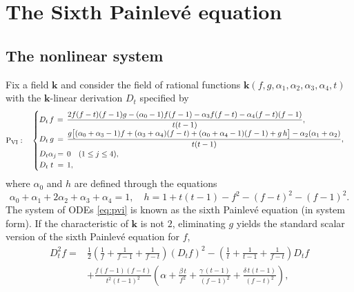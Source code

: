 \documentclass[a4paper,reqno]{amsart}
\numberwithin{equation}{section}
\numberwithin{figure}{section}
\theoremstyle{remark}
\newcommand\Psix{\textrm{P}_{\textrm{VI}}}
\begin{document}
\section{The Sixth Painlev\'e equation}\label{sect:p6}

\subsection{The nonlinear system}
Fix a field $\mathbf{k}$ and consider the field of rational functions $\mathbf{k}(f,g,\alpha_1,\alpha_2,\alpha_3,\alpha_4,t)$ with
the $\mathbf{k}$-linear derivation $D_t$ specified by
 \begin{equation}\label{eq:pvi}
 \Psix:\quad           \begin{cases}
     D_t \hspace{0.5mm}f\hspace{0.5mm}=\,\displaystyle\frac{2f(f-t)(f-1)g-(\alpha_0-1)f(f-1)-\alpha_3 f(f-t)-\alpha_4(f-t)(f-1)}{t(t-1)},  &\\
      D_t \hspace{0.7mm}g\hspace{0.7mm}=\,\displaystyle\frac{g\big[(\alpha_0+\alpha_3-1)f+(\alpha_3+\alpha_4)(f-t)+(\alpha_0+\alpha_4-1)(f-1)+g\,h\big]-\alpha_2(\alpha_1+\alpha_2)}{t(t-1)}, & \\
  D_t \alpha_j \hspace{-0.5mm}=\,0\quad (1\leq j\leq 4), &\\
        D_t \hspace{1.0mm}t\hspace{1.0mm}=\,1, &   
    \end{cases}
    \end{equation}
where $\alpha_0$ and $h$ are defined through the equations
\begin{equation*}
    \alpha_0+\alpha_1+2\alpha_2+\alpha_3+\alpha_4=1,\quad h=1+t(t-1)-f^2-(f-t)^2-(f-1)^2.
\end{equation*} 
The system of ODEs \eqref{eq:pvi} is known as the sixth Painlev\'e equation (in system form). If the characteristic of $\mathbf{k}$ is not $2$, eliminating $g$ yields the standard scalar version of the sixth Painlev\'e equation for $f$,
\begin{equation} \label{eq:PVIscalar}
\begin{aligned}
D_t^2f=&\frac{1}{2}\left(\frac{1}{f}+\frac{1}{f-1}+\frac{1}{f-t}\right)(D_t f)^2-\left(\frac{1}{t}+\frac{1}{t-1}+\frac{1}{f-t}\right)D_t f\\
&+\frac{f(f-1)(f-t)}{t^2(t-1)^2}\left(\alpha+\frac{\beta\, t}{f^2}+\frac{\gamma\,(t-1)}{(f-1)^2}+\frac{\delta \,t(t-1)}{(f-t)^2}\right),
\end{aligned}
\end{equation}
\end{document}
